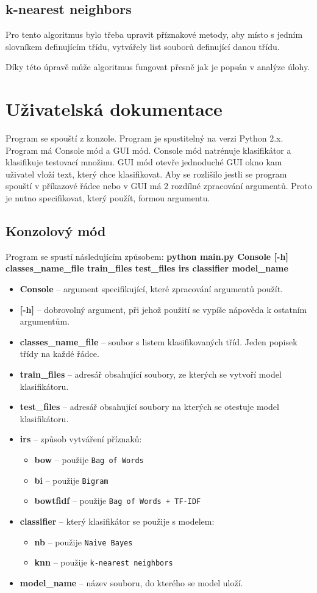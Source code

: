 \documentclass[12pt]{article}
\begin{document}
\subsection{k-nearest neighbors}
Pro tento algoritmus bylo třeba upravit příznakové metody, 
aby místo s jedním slovníkem definujícím třídu, vytvářely
list souborů definující danou třídu.

Díky této úpravě může algoritmus fungovat přesně jak je 
popsán v analýze úlohy.
%
%
\section{Uživatelská dokumentace}
Program se spouští z konzole. Program je spustitelný na verzi Python
2.x. Program má Console mód a GUI mód. Console mód natrénuje 
klasifikátor a klasifikuje testovací množinu. GUI mód otevře
jednoduché GUI okno kam uživatel vloží text, který chce klasifikovat.
Aby se rozlišilo jestli se program spouští v příkazové řádce
nebo v GUI má 2 rozdílné zpracování argumentů. Proto je nutno 
specifikovat, který použít, formou argumentu.
\subsection{Konzolový mód}
Program se spustí následujícím způsobem: 
\textbf{python main.py Console [-h] classes\_name\_file train\_files test\_files irs classifier model\_name}
\begin{itemize}
	\item \textbf{Console} -- argument specifikující, které zpracování argumentů
		použít.
	\item \textbf{[-h]} -- dobrovolný argument, při jehož použití se vypíše
		nápověda k ostatním argumentům.
	\item \textbf{classes\_name\_file} -- soubor s listem klasifikovaných tříd.
		Jeden popisek třídy na každé řádce.
	\item \textbf{train\_files} -- adresář obsahující soubory, ze kterých se 
		vytvoří model klasifikátoru.
	\item \textbf{test\_files} -- adresář obsahující soubory na kterých
		se otestuje model klasifikátoru.
	\item \textbf{irs} -- způsob vytváření příznaků:
		\begin{itemize}
			\item \textbf{bow} -- použije \texttt{Bag of Words}
			\item \textbf{bi} -- použije \texttt{Bigram}
			\item \textbf{bowtfidf} -- použije \texttt{Bag of Words
				+ TF-IDF}
		\end{itemize}
	\item \textbf{classifier} -- který klasifikátor se použije s modelem:
		\begin{itemize}
			\item \textbf{nb} -- použije \texttt{Naive Bayes}
			\item \textbf{knn} -- použije \texttt{k-nearest neighbors}
		\end{itemize}
	\item \textbf{model\_name} -- název souboru, do kterého se model uloží.
\end{itemize}
\end{document}
